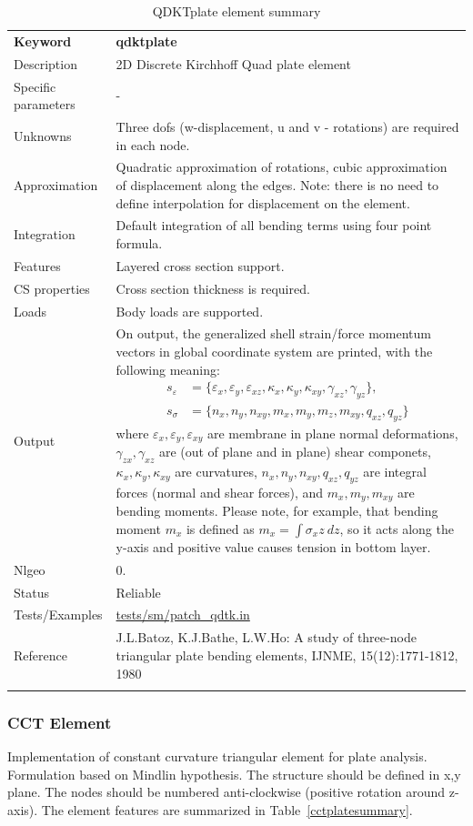 \documentclass[a4paper]{article}
\newcommand{\param}[1]{\texttt{#1}} %
\newcommand{\templabel}{}%
\newcommand{\tempcaption}{}%
\newcounter{nelpar}
\newenvironment{elementsummary}[5]{%
  \gdef\tempcaption{#4}%
  \gdef\templabel{#5}%
  \setcounter{nelpar}{0}%
  \begin{center} %
    \begin{table}[!htb] %
      \begin{tabular}{|l|p{9cm}|}\hline %
        {\bf Keyword} & \bf{#1}\\ %
        {Description} & {#2}\\ %
        {Specific parameters} & {#3}\\ \hline %
}{
  \\ \hline %
      \end{tabular}%
      \caption{\tempcaption}%
      \label{\templabel}%
    \end{table}%
  \end{center}%
}
\newcommand{\elementParam}[1]{%
  \ifthenelse{\value{nelpar}>0} %
             {&{#1}}%
             {\setcounter{nelpar}{1}Parameters&{#1}}%
             \\%
}
\newcommand{\elementDescription}[2]{{#1} & {#2}\\}
\begin{document}
\begin{elementsummary}{qdktplate}{2D Discrete Kirchhoff Quad plate element}{-}{QDKTplate element summary}{qdktplatesummary}
\elementDescription{Unknowns}{Three dofs (w-displacement, u and v - rotations) are required in each node.}
\elementDescription{Approximation}{Quadratic approximation of rotations, cubic approximation of displacement along the edges. Note: there is no need to define interpolation for displacement on the element.}
\elementDescription{Integration}{Default integration of all bending terms using four point formula.}
\elementDescription{Features}{Layered cross section support.}
\elementDescription{CS properties}{Cross section thickness is required.}
\elementDescription{Loads}{Body loads are supported.}
\elementDescription{Output}{On output, the generalized shell strain/force momentum vectors in global coordinate system are printed, with the following meaning:
\begin{align*}
s_{\varepsilon} &= \{\varepsilon_x, \varepsilon_y, \varepsilon_{xz}, \kappa_x, \kappa_y, \kappa_{xy}, \gamma_{xz}, \gamma_{yz}\},\\
s_{\sigma} &= \{n_x, n_y, n_{xy}, m_x, m_y, m_z, m_{xy}, q_{xz}, q_{yz}\}
\end{align*}
where $\varepsilon_x, \varepsilon_y, \varepsilon_{xy}$ are membrane in plane normal deformations, $\gamma_{zx}, \gamma_{xz}$ are (out of plane and in plane) shear componets, $\kappa_x, \kappa_y, \kappa_{xy}$ are curvatures, $n_x, n_y, n_{xy}, q_{xz}, q_{yz}$ are integral forces (normal and shear forces), and $m_x, m_y, m_{xy}$ are bending moments. 
Please note, for example, that bending moment $m_x$ is defined as $m_x=\int \sigma_x z\ dz$, so it acts along the y-axis and positive value causes tension in bottom layer.}
\elementDescription{Nlgeo}{0.}
\elementDescription{Status}{Reliable}
\elementDescription{Tests/Examples}{\href{https://github.com/oofem/oofem/blob/devel/tests/sm/patch\_qdtk.in}{tests/sm/patch\_qdtk.in}}
\elementDescription{Reference}{J.L.Batoz, K.J.Bathe, L.W.Ho: A study of three-node triangular plate bending elements, IJNME, 15(12):1771-1812, 1980}
\end{elementsummary}

\subsubsection {CCT Element}
\label{cct}
Implementation of constant curvature triangular element for plate
analysis. Formulation based on Mindlin hypothesis. The structure should be defined in x,y plane. 
The nodes should be numbered anti-clockwise (positive rotation around
z-axis). The element features are summarized in Table~\ref{cctplatesummary}.
\end{document}
